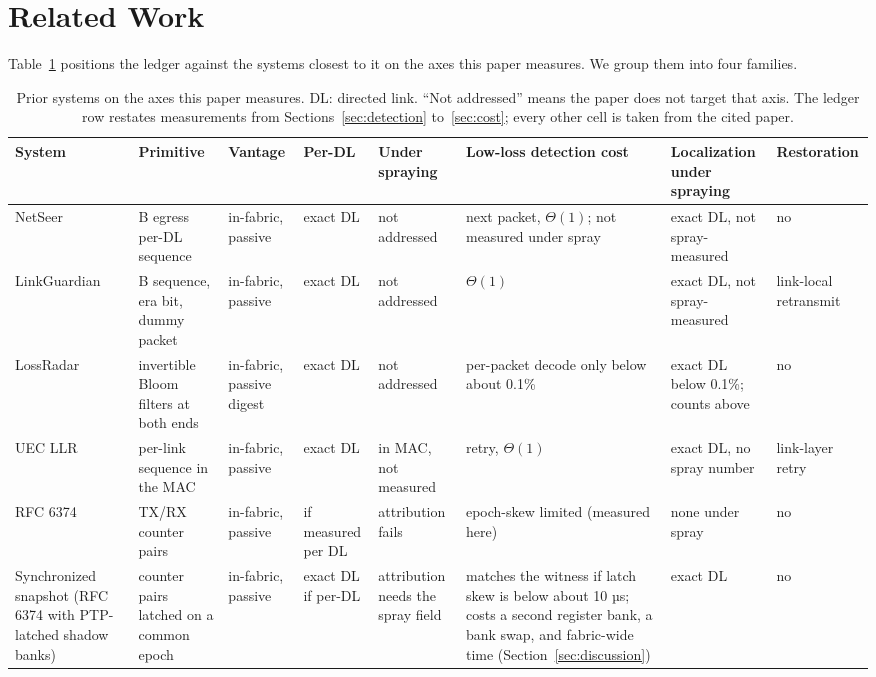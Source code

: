 \section{Related Work}
\label{sec:related}

Table~\ref{tab:related} positions the ledger against the systems closest to it on the axes this paper measures. We group them into four families.

\begin{table}[t]
\caption{Prior systems on the axes this paper measures. DL: directed link. ``Not addressed'' means the paper does not target that axis. The ledger row restates measurements from Sections~\ref{sec:detection} to~\ref{sec:cost}; every other cell is taken from the cited paper.}
\label{tab:related}
\centering
\scriptsize
\setlength{\tabcolsep}{2pt}
\begin{tabular}{@{}>{\raggedright\arraybackslash}p{1.55cm}>{\raggedright\arraybackslash}p{2.55cm}>{\raggedright\arraybackslash}p{1.7cm}>{\raggedright\arraybackslash}p{1.35cm}>{\raggedright\arraybackslash}p{1.8cm}>{\raggedright\arraybackslash}p{2.95cm}>{\raggedright\arraybackslash}p{2.75cm}>{\raggedright\arraybackslash}p{1.95cm}@{}}
\toprule
System & Primitive & Vantage & Per-DL & Under spraying & Low-loss detection cost & Localization under spraying & Restoration \\
\midrule
NetSeer~\cite{netseer} & 4 B egress per-DL sequence & in-fabric, passive & exact DL & not addressed & next packet, $\Theta(1)$; not measured under spray & exact DL, not spray-measured & no \\
LinkGuardian~\cite{linkguardian} & 3 B sequence, era bit, dummy packet & in-fabric, passive & exact DL & not addressed & $\Theta(1)$ & exact DL, not spray-measured & link-local retransmit \\
LossRadar~\cite{lossradar} & invertible Bloom filters at both ends & in-fabric, passive digest & exact DL & not addressed & per-packet decode only below about 0.1\% & exact DL below 0.1\%; counts above & no \\
UEC LLR~\cite{uec} & per-link sequence in the MAC & in-fabric, passive & exact DL & in MAC, not measured & retry, $\Theta(1)$ & exact DL, no spray number & link-layer retry \\
RFC 6374~\cite{rfc6374} & TX/RX counter pairs & in-fabric, passive & if measured per DL & attribution fails & epoch-skew limited (measured here) & none under spray & no \\
Synchronized snapshot (RFC 6374 with PTP-latched shadow banks) & counter pairs latched on a common epoch & in-fabric, passive & exact DL if per-DL & attribution needs the spray field & matches the witness if latch skew is below about 10 µs; costs a second register bank, a bank swap, and fabric-wide time (Section~\ref{sec:discussion}) & exact DL & no \\

\end{tabular}
\end{table}
